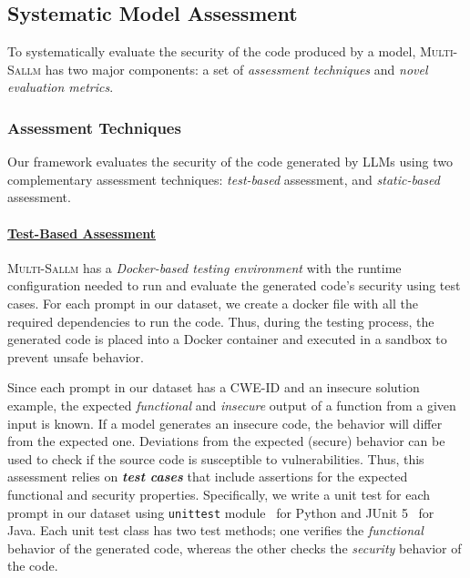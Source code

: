 \documentclass[pdflatex,sn-mathphys-ay]{sn-jnl}
\newcommand{\sandoval}[0]{\textsc{Multi-Sallm}}
\begin{document}
\subsection{Systematic Model Assessment}

To systematically evaluate the security of the code produced by a model, \sandoval{} has two major components: a set of \textit{ assessment techniques} and \textit{novel evaluation metrics}.


\subsubsection{Assessment Techniques}
Our framework evaluates the security of the code generated by LLMs using two complementary assessment techniques: \textit{test-based} assessment, and \textit{static-based} assessment.

\paragraph{\underline{Test-Based Assessment}}\label{subsubsec:AssertionBased}
\sandoval{} has a \textit{Docker-based testing environment} with the runtime configuration needed to run and evaluate the generated code's security using test cases. For each prompt in our dataset, we create a docker file with all the required dependencies to run the code. 
Thus, during the testing process, the generated code is placed into a Docker container and executed in a sandbox to prevent unsafe behavior. 


Since each prompt in our dataset has a CWE-ID and an insecure solution example, the expected \textit{functional} and \textit{insecure} output of a function from a given input is known.
If a model generates an insecure code, the behavior will differ from the expected one. Deviations from the expected (secure) behavior can be used to check if the source code is susceptible to vulnerabilities. Thus, this assessment relies on \textbf{\textit{test cases}} that include assertions for the expected functional and security properties. Specifically, we write a unit test for each prompt in our dataset using \texttt{unittest} module~\cite{unittest} for Python and JUnit 5~\cite{junit5} for Java. Each unit test class has two test methods; one verifies the \textit{functional} behavior of the generated code, whereas the other checks the \textit{security} behavior of the code. 
\end{document}

